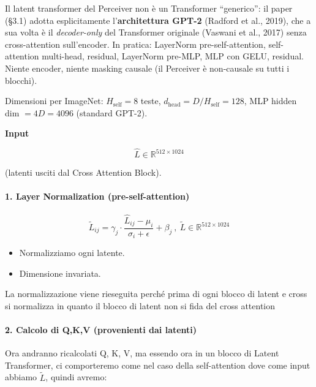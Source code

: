 \documentclass[
  11pt,
]{article}
\begin{document}
\begin{notabox}[title={\textbf{Architettura GPT-2 nel latent transformer}}]
Il latent transformer del Perceiver non è un Transformer ``generico'': il paper (\S3.1) adotta esplicitamente l'\textbf{architettura GPT-2} (Radford et al., 2019), che a sua volta è il \emph{decoder-only} del Transformer originale (Vaswani et al., 2017) senza cross-attention sull'encoder. In pratica: LayerNorm pre-self-attention, self-attention multi-head, residual, LayerNorm pre-MLP, MLP con GELU, residual. Niente encoder, niente masking causale (il Perceiver è non-causale su tutti i blocchi).

Dimensioni per ImageNet: $H_{\text{self}} = 8$ teste, $d_{\text{head}} = D/H_{\text{self}} = 128$, MLP hidden dim $= 4D = 4096$ (standard GPT-2).
\end{notabox}

\textbf{Input}

\[\widehat{L} \in \mathbb{R}^{512 \times 1024}\]

(latenti usciti dal Cross Attention Block).

\paragraph{1. \textbf{Layer Normalization (pre-self-attention)}}

\[{\widetilde{L}}_{ij} = \gamma_{j} \cdot \frac{{\widehat{L}}_{ij} - \mu_{i}}{\sigma_{i} + \epsilon} + \beta_{j}\ ,\ \widetilde{L} \in \mathbb{R}^{512 \times 1024}\]

\begin{itemize}
\item
  Normalizziamo ogni latente.
\item
  Dimensione invariata.
\end{itemize}

La normalizzazione viene rieseguita perché prima di ogni blocco di
latent e cross si normalizza in quanto il blocco di latent non si fida
del cross attention

\paragraph{2. \textbf{Calcolo di Q,K,V (provenienti dai latenti)}}

Ora andranno ricalcolati Q, K, V, ma essendo ora in un blocco di Latent
Transformer, ci comporteremo come nel caso della self-attention dove
come input abbiamo \(\widetilde{L}\), quindi avremo:
\end{document}
